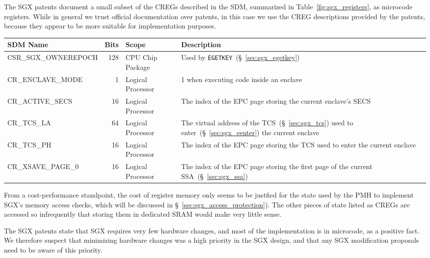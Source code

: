 
The SGX patents document a small subset of the CREGs described in the SDM,
summarized in Table~\ref{fig:sgx_registers}, as microcode registers. While in
general we trust official documentation over patents, in this case we use the
CREG descriptions provided by the patents, because they appear to be more
suitable for implementation purposes.


\begin{table*}[hbt]
  \centering
  \begin{tabularx}{\textwidth}{| l | r | l | X |}
  \hline
  \textbf{SDM Name} & \textbf{Bits} & \textbf{Scope} & \textbf{Description} \\
  \hline
  CSR\_SGX\_OWNEREPOCH & 128 & CPU Chip Package &
      Used by \texttt{EGETKEY}~(\S~\ref{sec:sgx_egetkey}) \\
  \hline
  CR\_ENCLAVE\_MODE & 1 & Logical Processor & 1 when executing code inside an
      enclave \\
  \hline
  CR\_ACTIVE\_SECS & 16 & Logical Processor & The index of the EPC page storing
      the current enclave's SECS \\
  \hline
  CR\_TCS\_LA & 64 & Logical Processor & The virtual address of the
      TCS~(\S~\ref{sec:sgx_tcs}) used to enter~(\S~\ref{sec:sgx_eenter}) the
      current enclave \\
  \hline
  CR\_TCS\_PH & 16 & Logical Processor & The index of the EPC page storing the
      TCS used to enter the current enclave \\
  \hline
  CR\_XSAVE\_PAGE\_0 & 16 & Logical Processor & The index of the EPC page
      storing the first page of the current SSA~(\S~\ref{sec:sgx_ssa}) \\
  \hline
  \end{tabularx}
  \caption{
    The fields in an EPCM entry.
  }
  \label{fig:sgx_registers}
\end{table*}

From a cost-performance standpoint, the cost of register memory only seems to
be justfied for the state used by the PMH to implement SGX's memory access
checks, which will be discussed in \S~\ref{sec:sgx_access_protection}). The
other pieces of state listed as CREGs are accessed so infrequently that storing
them in dedicated SRAM would make very little sense.

The SGX patents state that SGX requires very few hardware changes, and most of
the implementation is in microcode, as a positive fact. We therefore suspect
that minimizing hardware changes was a high priority in the SGX design, and
that any SGX modification proposals need to be aware of this priority.

